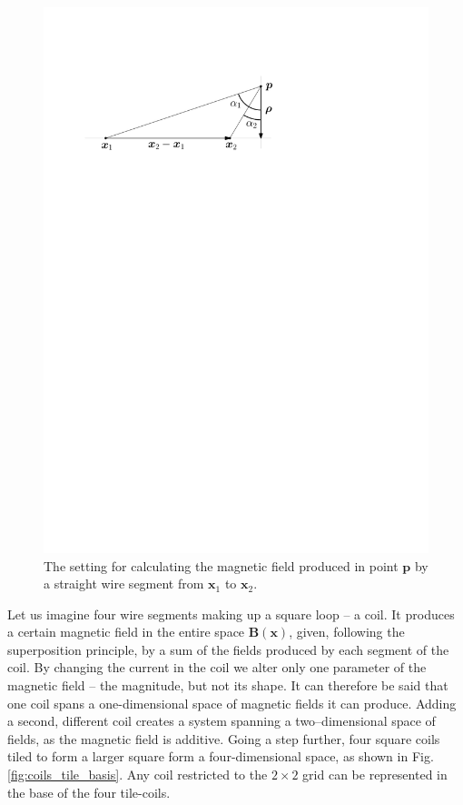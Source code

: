 \begin{figure}
  \centering
  \includegraphics[width=0.6\linewidth]{gfx/coils/biot_savart.pdf}
  \caption{The setting for calculating the magnetic field produced in point $\bm{p}$ by a straight wire segment from $\bm{x}_1$ to $\bm{x}_2$.}
  \label{fig:biot-savart}
\end{figure}

Let us imagine four wire segments making up a square loop -- a coil. It produces a certain magnetic field in the entire space $\mathbf{B}(\mathbf{x})$, given, following the superposition principle, by a sum of the fields produced by each segment of the coil.
By changing the current in the coil we alter only one parameter of the magnetic field -- the magnitude, but not its shape. It can therefore be said that one coil spans a one-dimensional space of magnetic fields it can produce. Adding a second, different coil creates a system spanning a two--dimensional space of fields, as the magnetic field is additive. Going a step further, four square coils tiled to form a larger square form a four-dimensional space, as shown in Fig.\,\ref{fig:coils_tile_basis}. Any coil restricted to the $2 \times 2$ grid can be represented in the base of the four tile-coils.


